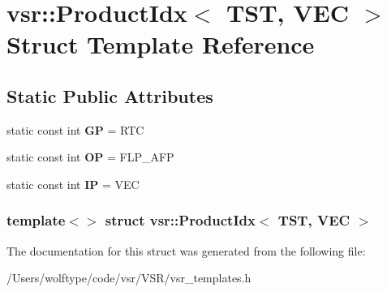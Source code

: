 \hypertarget{structvsr_1_1_product_idx_3_01_t_s_t_00_01_v_e_c_01_4}{\section{vsr\-:\-:Product\-Idx$<$ T\-S\-T, V\-E\-C $>$ Struct Template Reference}
\label{structvsr_1_1_product_idx_3_01_t_s_t_00_01_v_e_c_01_4}
}
\subsection*{Static Public Attributes}
\begin{DoxyCompactItemize}
\item 
\hypertarget{structvsr_1_1_product_idx_3_01_t_s_t_00_01_v_e_c_01_4_ab9349eb52bbfb3223a7b8a41c3cf3fc5}{static const int {\bfseries G\-P} = R\-T\-C}\label{structvsr_1_1_product_idx_3_01_t_s_t_00_01_v_e_c_01_4_ab9349eb52bbfb3223a7b8a41c3cf3fc5}

\item 
\hypertarget{structvsr_1_1_product_idx_3_01_t_s_t_00_01_v_e_c_01_4_a33f611e963ca6198ea65f5023418a4a9}{static const int {\bfseries O\-P} = F\-L\-P\-\_\-\-A\-F\-P}\label{structvsr_1_1_product_idx_3_01_t_s_t_00_01_v_e_c_01_4_a33f611e963ca6198ea65f5023418a4a9}

\item 
\hypertarget{structvsr_1_1_product_idx_3_01_t_s_t_00_01_v_e_c_01_4_a09169e5d8a9c1d0115812e2e4421932f}{static const int {\bfseries I\-P} = V\-E\-C}\label{structvsr_1_1_product_idx_3_01_t_s_t_00_01_v_e_c_01_4_a09169e5d8a9c1d0115812e2e4421932f}

\end{DoxyCompactItemize}
\subsubsection*{template$<$$>$ struct vsr\-::\-Product\-Idx$<$ T\-S\-T, V\-E\-C $>$}



The documentation for this struct was generated from the following file\-:\begin{DoxyCompactItemize}
\item 
/\-Users/wolftype/code/vsr/\-V\-S\-R/vsr\-\_\-templates.\-h\end{DoxyCompactItemize}
